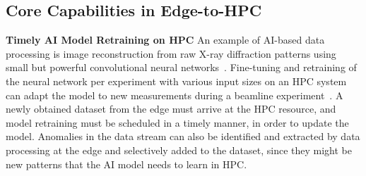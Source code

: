 
\subsection{Core Capabilities in Edge-to-HPC}




%

\textbf{Timely AI Model Retraining on HPC}
%
An example of AI-based data processing is image reconstruction from raw X-ray diffraction patterns using small but powerful convolutional neural networks~\cite{babu2022deep}. Fine-tuning and retraining of the neural network per experiment with various input sizes on an HPC system can adapt the model to new measurements during a beamline experiment~\cite{babu2022deep}. A newly obtained dataset from the edge must arrive at the HPC resource, and model retraining must be scheduled in a timely manner, in order to update the model.
Anomalies in the data stream can also be identified and extracted by data processing at the edge and selectively added to the dataset, since they might be new patterns that the AI model needs to learn in HPC.

